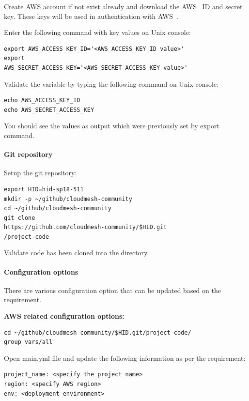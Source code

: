 Create AWS account if not exist already and download the
AWS~\cite{hid-sp18-511-www-aws} ID and secret key. These keys will be
used in authentication with AWS~\cite{hid-sp18-511-www-aws}.

Enter the following command with key values on Unix console:

\begin{verbatim}
export AWS_ACCESS_KEY_ID='<AWS_ACCESS_KEY_ID value>' 
export
AWS_SECRET_ACCESS_KEY='<AWS_SECRET_ACCESS_KEY value>'
\end{verbatim}

Validate the variable by typing the following command on Unix console:
\begin{verbatim}
echo AWS_ACCESS_KEY_ID
echo AWS_SECRET_ACCESS_KEY
\end{verbatim}

You should see the values as output which were previously set by
export command.

\paragraph{Git repository}

Setup the git repository:

\begin{verbatim}
export HID=hid-sp18-511 
mkdir -p ~/github/cloudmesh-community
cd ~/github/cloudmesh-community 
git clone
https://github.com/cloudmesh-community/$HID.git
/project-code
\end{verbatim}

Validate code has been cloned into the directory.

\paragraph{Configuration options}

There are various configuration option that can be updated based on
the requirement.

\textbf{AWS related configuration options:}

\begin{verbatim}
cd ~/github/cloudmesh-community/$HID.git/project-code/
group_vars/all
\end{verbatim}

Open main.yml file and update the following information as per the
requirement:

\begin{verbatim}
project_name: <specify the project name>
region: <specify AWS region>
env: <deployment environment>
\end{verbatim}

